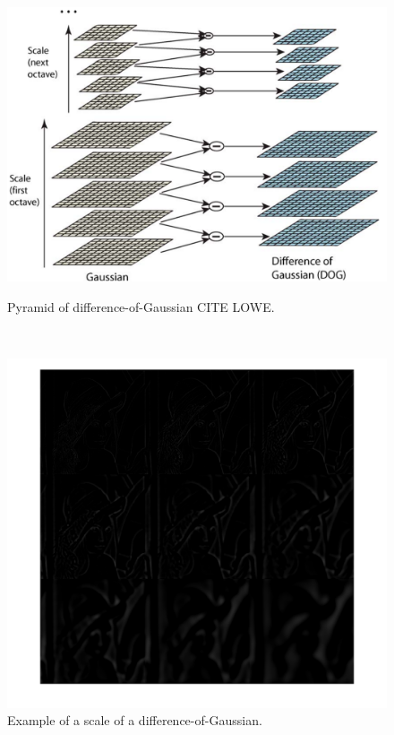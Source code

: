 \documentclass[12pt]{article}
\begin{document}
\begin{figure}[htbp]
	\centering
	\begin{minipage}[t]{.48\textwidth}
		\centering
		\includegraphics[width=1.05\textwidth]{images/diffOfGauFromPaper}
		\caption{Pyramid of difference-of-Gaussian CITE LOWE.}
		\label{fig:difOfGauPyramid}
	\end{minipage} ~
	\begin{minipage}[t]{.48\textwidth}
		\centering
		\includegraphics[width=1\textwidth]{images/dogSpace}
		\caption{Example of a scale of a difference-of-Gaussian.}
		\label{fig:difOfGauSample}
	\end{minipage}
\end{figure}
\end{document}
